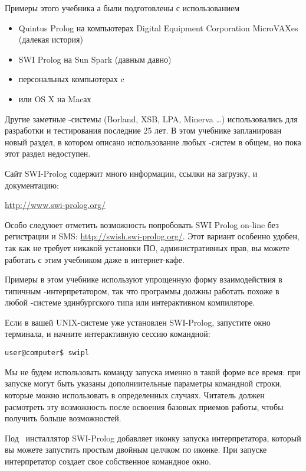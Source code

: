 \label{fish1}

Примеры этого учебника \prolog а были подготовлены с использованием

\begin{itemize}[nosep]
  \item Quintus Prolog на компьютерах Digital Equipment Corporation MicroVAXes
  (далекая история)
  \item SWI Prolog на Sun Spark (давным давно)
  \item персональных компьютерах c \win
  \item или OS X на Macах  
\end{itemize}
 
Другие заметные \prolog-системы (Borland, XSB, LPA, Minerva \ldots)
использовались для разработки и тестирования последние 25 лет.
В этом учебнике запланирован новый раздел, в котором описано использование
любых \prolog-систем в общем, но пока этот раздел недоступен.

Сайт SWI-Prolog содержит много информации, ссылки на загрузку, и документацию:

\url{http://www.swi-prolog.org/}

Особо следуюет отметить возможность попробовать SWI Prolog on-line без 
регистрации и SMS: \url{http://swish.swi-prolog.org/}. Этот вариант особенно
удобен, так как не требует никакой установки ПО, административных прав, вы
можете работать с этим учебником даже в интернет-кафе.

\bigskip
Примеры в этом учебнике используют упрощенную форму взаимодействия в типичным
\prolog-интерпретатором, так что программы должны работать похоже в любой
\prolog-системе эдинбургского типа или интерактивном компиляторе.

Если в вашей UNIX-системе уже установлен SWI-Prolog, запустите окно
терминала, и начните интерактивную сессию командной:

\begin{verbatim}
user@computer$ swipl
\end{verbatim}

Мы не будем использовать команду запуска именно в такой форме все время:
при запуске могут быть указаны дополниительные параметры командной строки,
которые можно использовать в определенных случаях. Читатель должен расмотреть
эту возможность после освоения базовых приемов работы, чтобы получить больше
возможностей.

\bigskip
Под \win\ инсталлятор SWI-Prolog добавляет иконку запуска
интерпретатора, который вы можете запустить простым двойным целчком по
иконке. При запуске интерпретатор создает свое собственное командное окно.
\bigskip

